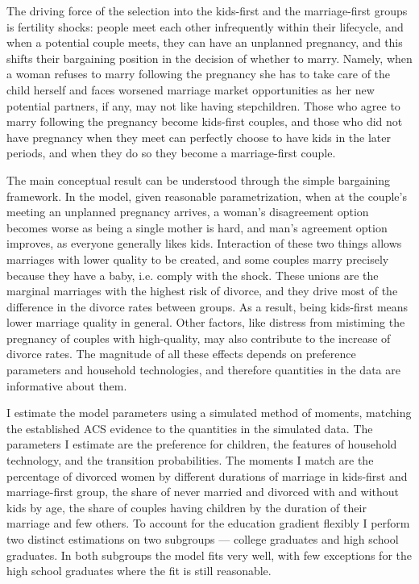 \documentclass[12pt,letter]{article}
\begin{document}
The driving force of the selection into the kids-first and the marriage-first groups is fertility shocks: people meet each other infrequently within their lifecycle, and when a potential couple meets, they can have an unplanned pregnancy, and this shifts their bargaining position in the decision of whether to marry. Namely, when a woman refuses to marry following the pregnancy she has to take care of the child herself and faces worsened marriage market opportunities as her new potential partners, if any, may not like having stepchildren. Those who agree to marry following the pregnancy become kids-first couples, and those who did not have pregnancy when they meet can perfectly choose to have kids in the later periods, and when they do so they become a marriage-first couple.

The main conceptual result can be understood through the simple bargaining framework. In the model, given reasonable parametrization, when at the couple's meeting an unplanned pregnancy arrives, a woman's disagreement option becomes worse as being a single mother is hard, and man's agreement option improves, as everyone generally likes kids. Interaction of these two things allows marriages with lower quality to be created, and some couples marry precisely because they have a baby, i.e. comply with the shock. These unions are the marginal marriages with the highest risk of divorce, and they drive most of the difference in the divorce rates between groups. As a result, being kids-first means lower marriage quality in general. Other factors, like distress from mistiming the pregnancy of couples with high-quality, may also contribute to the increase of divorce rates. The magnitude of all these effects depends on preference parameters and household technologies, and therefore quantities in the data are informative about them. 

I estimate the model parameters using a simulated method of moments, matching the established ACS evidence to the quantities in the simulated data. The parameters I estimate are the preference for children, the features of household technology, and the transition probabilities. The moments I match are the percentage of divorced women by different durations of marriage in kids-first and marriage-first group, the share of never married and divorced with and without kids by age, the share of couples having children by the duration of their marriage and few others. To account for the education gradient flexibly I perform two distinct estimations on two subgroups --- college graduates and high school graduates. In both subgroups the model fits very well, with few exceptions for the high school graduates where the fit is still reasonable.
\end{document}
